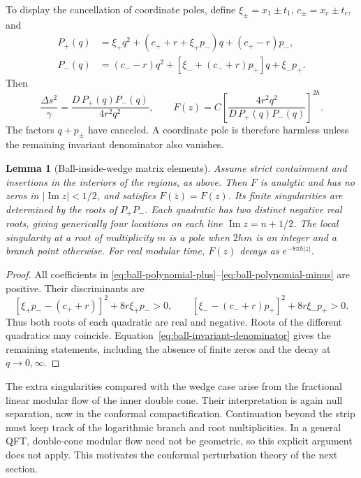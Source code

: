 \documentclass[a4paper,11pt]{article}
\newtheorem{lemma}[theorem]{Lemma}
\theoremstyle{definition}
\begin{document}
To display the cancellation of coordinate poles, define $\xi_\pm=x_1\pm t_1$, $c_\pm=x_c\pm t_c$, and
\begin{align}
 P_+(q)&=\xi_+q^2+(c_++r+\xi_+p_-)q+(c_+-r)p_-,
 \label{eq:ball-polynomial-plus}\\
 P_-(q)&=(c_--r)q^2+[\xi_-+(c_-+r)p_+]q+\xi_-p_+.
 \label{eq:ball-polynomial-minus}
\end{align}
Then
\begin{equation}
 \frac{\Delta s^2}{\gamma}
 =\frac{D\,P_+(q)P_-(q)}{4r^2q^2},\qquad
 F(z)=C\left[\frac{4r^2q^2}{D\,P_+(q)P_-(q)}\right]^{2h}.
 \label{eq:ball-invariant-denominator}
\end{equation}
The factors $q+p_\pm$ have canceled. A coordinate pole is therefore harmless unless the remaining invariant denominator also vanishes.

\begin{lemma}[Ball-inside-wedge matrix elements]
\label{lem:ball-matrix-element}
Assume strict containment and insertions in the interiors of the regions, as above. Then $F$ is analytic and has no zeros in $|\operatorname{Im}z|<1/2$, and satisfies $F(\bar z)=\overline{F(z)}$. Its finite singularities are determined by the roots of $P_+P_-$. Each quadratic has two distinct negative real roots, giving generically four locations on each line $\operatorname{Im}z=n+1/2$. The local singularity at a root of multiplicity $m$ is a pole when $2hm$ is an integer and a branch point otherwise. For real modular time, $F(z)$ decays as $e^{-8\pi h|z|}$.
\end{lemma}
\begin{proof}
All coefficients in \eqref{eq:ball-polynomial-plus}--\eqref{eq:ball-polynomial-minus} are positive. Their discriminants are
\[
 [\xi_+p_--(c_++r)]^2+8r\xi_+p_->0,
 \qquad
 [\xi_--(c_-+r)p_+]^2+8r\xi_-p_+>0.
\]
Thus both roots of each quadratic are real and negative. Roots of the different quadratics may coincide. Equation~\eqref{eq:ball-invariant-denominator} gives the remaining statements, including the absence of finite zeros and the decay at $q\to0,\infty$.
\end{proof}

The extra singularities compared with the wedge case arise from the fractional linear modular flow of the inner double cone. Their interpretation is again null separation, now in the conformal compactification. Continuation beyond the strip must keep track of the logarithmic branch and root multiplicities. In a general QFT, double-cone modular flow need not be geometric, so this explicit argument does not apply. This motivates the conformal perturbation theory of the next section.
\end{document}
